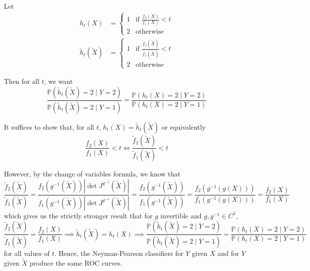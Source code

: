 \documentclass[11pt]{report}
\renewcommand{\P}{\mathbb{P}}
\newcommand{\abs}[1]{\left| #1 \right|}
\begin{document}
\begin{enumerate}[1.]
\begin{enumerate}
		            \color{blue}
		            Let
		            \begin{align*}
			            h_t(X)               & = \begin{cases}
				                                     1 & \text{if } \frac{f_2(X)}{f_1(X)} < t \\
				                                     2 & \text{otherwise}
			                                     \end{cases}                             \\
			            \tilde h_t(\tilde X) & = \begin{cases}
				                                     1 & \text{if } \frac{\tilde f_2(\tilde X)}{\tilde f_1(\tilde X)} < t \\
				                                     2 & \text{otherwise}
			                                     \end{cases}
		            \end{align*}

		            Then for all $t$, we want
		            \[\frac{\P(\tilde h_t(\tilde X) = 2 \; | \; Y = 2)}{\P(\tilde h_t(\tilde X) = 2 \; | \; Y = 1)} = \frac{\P( h_t( X) = 2 \; | \; Y = 2)}{\P( h_t(X) = 2 \; | \; Y = 1)}\]

		            It suffices to show that, for all $t$, $h_t(X) = \tilde h_t(\tilde X)$ or equivalently
		            \[\frac{f_2(X)}{f_1(X)} < t \iff \frac{\tilde f_2(\tilde X)}{\tilde f_1(\tilde X)} < t \]

		            However, by the change of variables formula, we know that
		            \[\frac{\tilde f_2(\tilde X)}{\tilde f_1(\tilde X)} = \frac{f_2(g^{-1}(\tilde X)) \abs{\det J^{g^{-1}}(\tilde X)}}{f_1(g^{-1}(\tilde X)) \abs{\det J^{g^{-1}}(\tilde X)}} = \frac{f_2(g^{-1}(\tilde X))}{f_1(g^{-1}(\tilde X))} = \frac{f_2(g^{-1}(g(X)))}{f_1(g^{-1}(g(X)))} = \frac{f_2(X)}{f_1(X)}\]
		            which gives us the strictly stronger result that for $g$ invertible and $g, g^{-1} \in C^1$,
		            \[\frac{\tilde f_2(\tilde X)}{\tilde f_1(\tilde X)} = \frac{f_2(X)}{f_1(X)} \implies \tilde h_t(\tilde X) = h_t(X) \implies \frac{\P(\tilde h_t(\tilde X) = 2 \; | \; Y = 2)}{\P(\tilde h_t(\tilde X) = 2 \; | \; Y = 1)} = \frac{\P( h_t( X) = 2 \; | \; Y = 2)}{\P( h_t(X) = 2 \; | \; Y = 1)} \]
		            for all values of $t$. Hence, the Neyman-Pearson classifiers for $Y$ given $X$ and for $Y$ given $\tilde{X}$ produce the same ROC curves.

		            \color{black}
	      \end{enumerate}


\end{enumerate}
\end{document}
